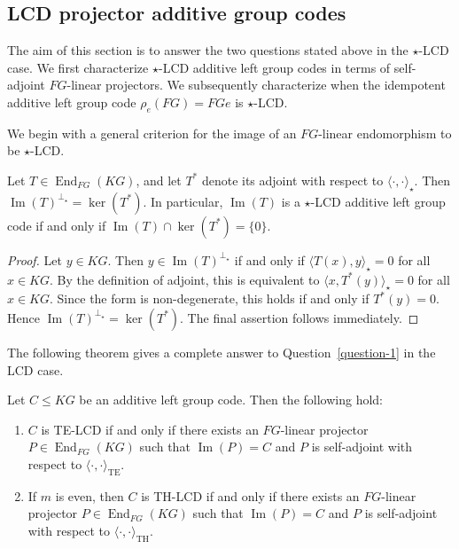 \documentclass[11pt]{article}
\begin{document}
\subsection{LCD projector additive group codes}

The aim of this section is to answer the two questions stated above in the $\star$-LCD case. We first characterize $\star$-LCD additive left group codes in terms of self-adjoint $FG$-linear projectors. We subsequently characterize when  the idempotent additive left group code $\rho_e(FG)=FGe$ is $\star$-LCD.



We begin with a general criterion for the image of an $FG$-linear endomorphism to be $\star$-LCD.

\begin{lemma}\label{lem:image-projector-dual-kernel}
Let $T\in \operatorname{End}_{FG}(KG)$, and let $T^\ast$ denote its adjoint with respect to $\langle\cdot,\cdot\rangle_\star$. Then
$\operatorname{Im}(T)^{\perp_\star}=\ker(T^\ast).$
In particular, $\operatorname{Im}(T)$ is a $\star$-LCD additive left group code if and only if
$\operatorname{Im}(T)\cap \ker(T^\ast)=\{0\}.$
\end{lemma}

\begin{proof}
Let $y\in KG$. Then
$y\in \operatorname{Im}(T)^{\perp_\star}$
if and only if
$\langle T(x),y\rangle_\star=0$
for all $x\in KG.$
By the definition of adjoint, this is equivalent to
$\langle x,T^\ast(y)\rangle_\star=0$
for all $x\in KG.$
Since the form is non-degenerate, this holds if and only if $T^\ast(y)=0$. Hence
$\operatorname{Im}(T)^{\perp_\star}=\ker(T^\ast).$
The final assertion follows immediately.
\end{proof}

The following theorem gives a complete answer to Question~\ref{question-1} in the LCD case.

\begin{theorem}\label{thm:LCD-projector-characterization}
Let $C\leq KG$ be an additive left group code. Then the following hold:
\begin{enumerate}
    \item $C$ is TE-LCD if and only if there exists an $FG$-linear projector $P\in \operatorname{End}_{FG}(KG)$ such that $\operatorname{Im}(P)=C$ and $P$ is self-adjoint with respect to $\langle\cdot,\cdot\rangle_{\mathrm{TE}}$.

    \item If $m$ is even, then $C$ is TH-LCD if and only if there exists an $FG$-linear projector $P\in \operatorname{End}_{FG}(KG)$ such that $\operatorname{Im}(P)=C$ and $P$ is self-adjoint with respect to $\langle\cdot,\cdot\rangle_{\mathrm{TH}}$.
\end{enumerate}
\end{theorem}
\end{document}
